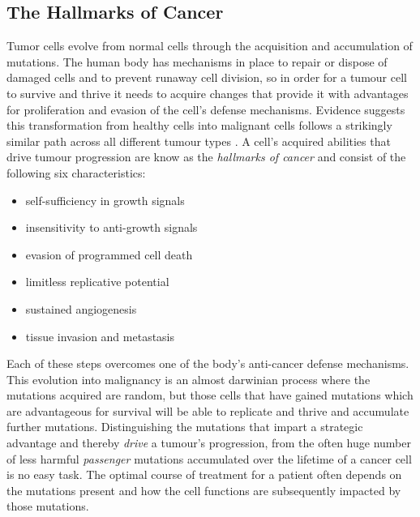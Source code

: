 \subsection{The Hallmarks of Cancer}

Tumor cells evolve from normal cells through the acquisition and accumulation of mutations. The human body has mechanisms in place to repair or dispose of damaged cells and to prevent runaway cell division, so in order for a tumour cell to survive and thrive it needs to acquire changes that provide it with advantages for proliferation and evasion of the cell's defense mechanisms. Evidence suggests this transformation from healthy cells into malignant cells follows a strikingly similar path across all different tumour types \cite{}. A cell's acquired abilities that drive tumour progression are know as the \emph{hallmarks of cancer} and consist of the following six characteristics:

\begin{itemize}
    \itemsep-0.5em
    \item self-sufficiency in growth signals
    \item insensitivity to anti-growth signals
    \item evasion of programmed cell death
    \item limitless replicative potential
    \item sustained angiogenesis
    \item tissue invasion and metastasis
\end{itemize}

Each of these steps overcomes one of the body's anti-cancer defense mechanisms. This evolution into malignancy is an almost darwinian process where the mutations acquired are random, but those cells that have gained mutations which are advantageous for survival will be able to replicate and thrive and accumulate further mutations. Distinguishing the mutations that impart a strategic advantage and thereby \emph{drive} a tumour's progression, from the often huge number of less harmful \emph{passenger} mutations accumulated over the lifetime of a cancer cell is no easy task. The optimal course of treatment for a patient often depends on the mutations present and how the cell functions are subsequently impacted by those mutations. %



